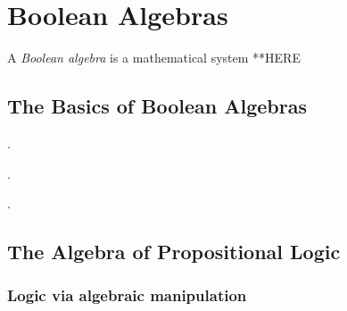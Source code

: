 \section{Boolean Algebras}
\label{sec:Boolean-Algebra}

A {\it Boolean algebra} is a mathematical system **HERE

\subsection{The Basics of Boolean Algebras}

.


.

.

\subsection{The Algebra of Propositional Logic}
\label{sec:Propositional-logic}


\subsubsection{Logic via algebraic manipulation}



